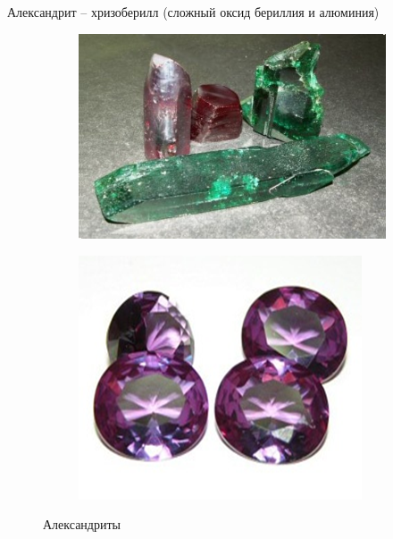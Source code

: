 \documentclass[_Banking_p3.tex]{subfiles}
\begin{document}
\begin{frame}{Александрит }{– хризоберилл (сложный оксид бериллия и алюминия)}
\begin{figure}	
	\centering
	\begin{subfigure}[t]{4.3cm}
		\centering
		\includegraphics[scale=0.45]{img/alexandrite1.png}
	\caption{}\label{fig:alexandrite1}	
	\end{subfigure}
	\quad
	\begin{subfigure}[t]{4.3cm}
		\centering
		\includegraphics[scale=0.55]{img/alexandrite2.png}
		\caption{}\label{fig:alexandrite2}
	\end{subfigure}
	\caption{Александриты}\label{fig:alexandrites}
\end{figure}
\end{frame}
\end{document}
